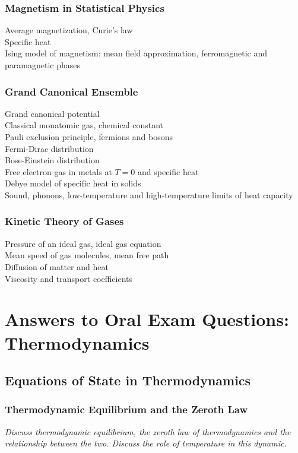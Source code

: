 \documentclass[11pt, a4paper]{article}
\begin{document}
\subsubsection{Magnetism in Statistical Physics}
Average magnetization, Curie's law\\
Specific heat\\
Ising model of magnetism: mean field approximation, ferromagnetic and paramagnetic phases

\subsubsection{Grand Canonical Ensemble}
Grand canonical potential\\
Classical monatomic gas, chemical constant\\
Pauli exclusion principle, fermions and bosons\\
Fermi-Dirac distribution\\
Bose-Einstein distribution\\
Free electron gas in metals at $ T = 0 $ and specific heat\\
Debye model of specific heat in solids\\
Sound, phonons, low-temperature and high-temperature limits of heat capacity

\subsubsection{Kinetic Theory of Gases}
Pressure of an ideal gas, ideal gas equation\\
Mean speed of gas molecules, mean free path\\
Diffusion of matter and heat\\
Viscosity and transport coefficients


\fi
\newpage

\section{Answers to Oral Exam Questions: Thermodynamics}

\subsection{Equations of State in Thermodynamics}

\subsubsection{Thermodynamic Equilibrium and the Zeroth Law}
\textit{Discuss thermodynamic equilibrium, the zeroth law of thermodynamics and the relationship between the two. Discuss the role of temperature in this dynamic.}
\end{document}

